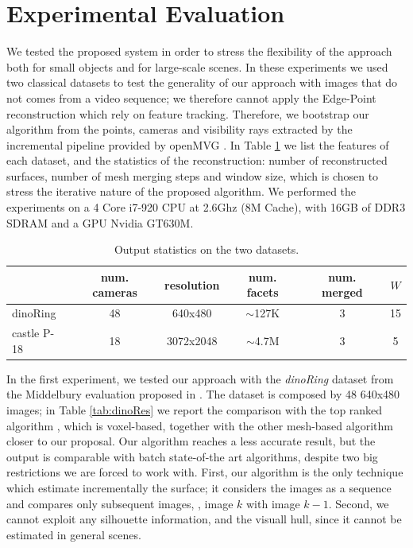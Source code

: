 \section{Experimental Evaluation}
\label{sec:exp}
We tested the proposed system in order to stress the flexibility of the approach both for small objects and for large-scale scenes.
In these experiments we used two classical \mvs datasets to test the generality of our approach with  images that do not comes from a video  sequence; we therefore cannot apply the Edge-Point reconstruction which rely on feature tracking. 
Therefore, we bootstrap our algorithm from the points, cameras and visibility rays extracted by the incremental pipeline provided by openMVG \cite{openMVG}. 
In Table \ref{fig:expData} we list the features of each dataset, and the statistics of the reconstruction: number of reconstructed surfaces, number of mesh merging steps and window size, which is chosen to stress the iterative nature of the proposed algorithm.
We performed the experiments on a 4 Core i7-920 CPU at 2.6Ghz (8M Cache), with 16GB of DDR3 SDRAM and a GPU Nvidia GT630M.


\begin{table}[t]
\normalsize
\centering
\setlength{\tabcolsep}{1px}
  \caption{Output statistics on the two datasets.}
  \label{fig:expData}
\begin{tabular}{lccccc}
&num. cameras& resolution&num. facets& num. merged &$W$ \\
\hline
dinoRing&48&640x480&$\sim$127K&3&15\\
castle P-18&18&3072x2048&$\sim$4.7M&3&5\\
\end{tabular}
\end{table}

In the first experiment, we tested our approach with the \emph{dinoRing} dataset  from the Middelbury evaluation proposed in \cite{seitz2006comparison}. 
The dataset is composed by 48 640x480 images; in Table \ref{tab:dinoRes} we report the comparison with the top ranked algorithm \cite{savinov2016semantic}, which is voxel-based, together with the other mesh-based algorithm closer to our proposal.
Our algorithm reaches a less accurate result, but  the output is comparable with batch state-of-the art algorithms, despite two big restrictions we are forced to work with.
First, our algorithm is the only technique  which estimate incrementally the surface; it considers the images as a sequence and compares only subsequent images, \ie, image $k$ with image $k-1$.
Second, we cannot exploit any silhouette information, and the visuall hull, since it cannot be estimated in general scenes.

